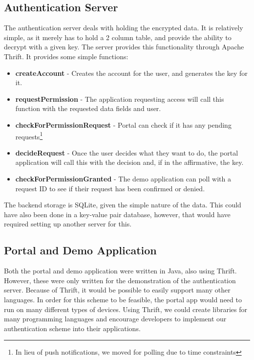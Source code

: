 \documentclass[letterpaper,twocolumn,10pt]{article}
\begin{document}
%

\subsection{Authentication Server}
    The authentication server deals with holding the encrypted data. It is relatively simple, as it merely has to hold a 2 column table, and provide the ability to decrypt with a given key. The server provides this functionality through Apache Thrift\cite{thrift}. It provides some simple functions:
    \begin{itemize}
        \item \textbf{createAccount} - Creates the account for the user, and generates the key for it.
        \item \textbf{requestPermission} - The application requesting access will call this function with the requested data fields and user.
        \item \textbf{checkForPermissionRequest} - Portal can check if it has any pending requests\footnote{In lieu of push notifications, we moved for polling due to time constraints} 
        \item \textbf{decideRequest} - Once the user decides what they want to do, the portal application will call this with the decision and, if in the affirmative, the key.
        \item \textbf{checkForPermissionGranted} - The demo application can poll with a request ID to see if their request has been confirmed or denied.
    \end{itemize}

The backend storage is SQLite, given the simple nature of the data. This could have also been done in a key-value pair database, however, that would have required setting up another server for this.

\subsection{Portal and Demo Application}
Both the portal and demo application were written in Java, also using Thrift. However, these were only written for the demonstration of the authentication server. Because of Thrift, it would be possible to easily support many other languages. In order for this scheme to be feasible, the portal app would need to run on many different types of devices. Using Thrift, we could create libraries for many programming languages and encourage developers to implement our authentication scheme into their applications.
\end{document}

